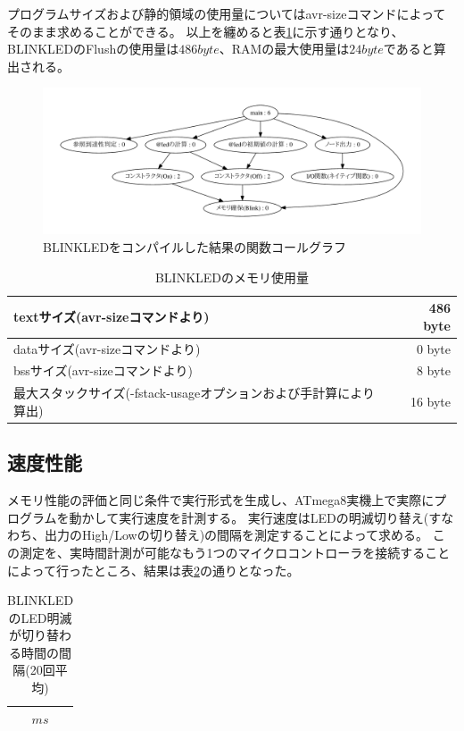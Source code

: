 プログラムサイズおよび静的領域の使用量についてはavr-sizeコマンドによってそのまま求めることができる。
以上を纏めると表\ref{fig:size}に示す通りとなり、
BLINKLEDのFlushの使用量は$486byte$、RAMの最大使用量は$24byte$であると算出される。

\begin{figure}[h]
 \begin{center}
  \includegraphics[width=160mm]{figure/call_graph.pdf}
 \end{center}
 \caption{BLINKLEDをコンパイルした結果の関数コールグラフ}
 \label{fig:call-graph}
\end{figure}

\begin{table}[h]
  \centering
  \begin{tabular}{l|r}
    textサイズ(avr-sizeコマンドより) & 486 byte \\ \hline
    dataサイズ(avr-sizeコマンドより) & 0 byte \\ \hline
    bssサイズ(avr-sizeコマンドより)  & 8 byte \\ \hline
    最大スタックサイズ(-fstack-usageオプションおよび手計算により算出)  & 16 byte \\ \hline
  \end{tabular}
\caption{BLINKLEDのメモリ使用量}
\label{fig:size}
\end{table}


\subsection{速度性能}
メモリ性能の評価と同じ条件で実行形式を生成し、ATmega8実機上で実際にプログラムを動かして実行速度を計測する。
実行速度はLEDの明滅切り替え(すなわち、出力のHigh/Lowの切り替え)の間隔を測定することによって求める。
この測定を、実時間計測が可能なもう1つのマイクロコントローラを接続することによって行ったところ、結果は表\ref{fig:time1}の通りとなった。

\begin{table}[h]
  \centering
  \begin{tabular}{c}
    $ ms$ \\ \hline
  \end{tabular}
\caption{BLINKLEDのLED明滅が切り替わる時間の間隔(20回平均)}
\label{fig:time1}
\end{table}

